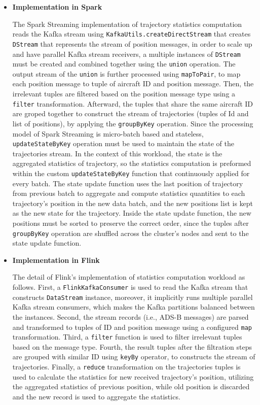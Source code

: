 \documentclass[]{article}
\begin{document}
\begin{itemize}
\item {\bf{Implementation in Spark }}

\par The Spark Streaming implementation of trajectory statistics computation reads the Kafka stream using \texttt{KafkaUtils.createDirectStream} that creates \texttt{DStream} that represents the stream of position messages, in order to scale up and have parallel Kafka stream receivers, a multiple instances of \texttt{DStream} must be created and combined together using the \texttt{union} operation. The output stream of the \texttt{union} is further processed using \texttt{mapToPair}, to map each position message to tuple of aircraft ID and position message. Then, the irrelevant tuples are filtered based on the position message type using  a \texttt{filter} transformation. Afterward, the tuples that share the same aircraft ID are groped together to construct the stream of trajectories (tuples of Id and list of positions), by applying the \texttt{groupByKey} operation. Since the processing  model of Spark Streaming is micro-batch based and stateless, \texttt{updateStateByKey} operation must be used to maintain the state of the trajectories stream. In the context of this workload, the state is the aggregated statistics of trajectory, so the statistics computation is preformed within the custom \texttt{updateStateByKey} function that continuously applied for every batch.
 The state update function uses the last position of trajectory from previous batch to aggregate and compute statistics quantities to each trajectory's position in the new data batch, and the new positions list is kept as the new state for the trajectory. Inside the state update function, the new positions must be sorted to preserve the correct order, since the tuples after \texttt{groupByKey} operation are shuffled across the cluster's  nodes and sent to the state update function.

\item {\bf{Implementation in Flink }}


The detail of Flink's implementation of statistics computation workload as follows. First, a \texttt{FlinkKafkaConsumer} is used to read the Kafka stream that constructs \texttt{DataStream} instance, moreover, it implicitly runs multiple parallel Kafka stream consumers, which makes the Kafka partitions balanced between the instances. Second, the stream records (i.e., ADS-B messages) are parsed and transformed to tuples of ID and position message using a configured \texttt{map} transformation. Third, a \texttt{filter} function is used to filter irrelevant tuples based on the message type. Fourth, the result tuples after the filtration steps are grouped with similar ID using \texttt{keyBy} operator, to constructs the stream of trajectories. Finally, 
a \texttt{reduce} transformation on the trajectories tuples is used to calculate the statistics for new received trajectory's position, utilizing the aggregated statistics of previous position, while old position is discarded and the new record is used to aggregate the statistics.



\end{itemize}
\end{document}
